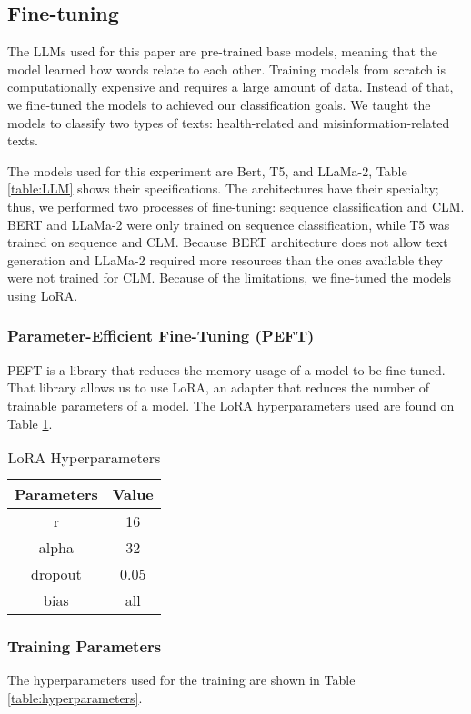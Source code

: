 \subsection{Fine-tuning}

The LLMs used for this paper are pre-trained base models, meaning that the model learned how words relate to each other. Training models from scratch is computationally expensive and requires a large amount of data. Instead of that, we fine-tuned the models to achieved our classification goals. We taught the models to classify two types of texts: health-related and misinformation-related texts. 

The models used for this experiment are Bert, T5, and LLaMa-2, Table \ref{table:LLM} shows their specifications. The architectures have their specialty; thus, we performed two processes of fine-tuning: sequence classification and CLM. BERT and LLaMa-2 were only trained on sequence classification, while T5 was trained on sequence and CLM. Because BERT architecture does not allow text generation and LLaMa-2 required more resources than the ones available they were not trained for CLM. Because of the limitations, we fine-tuned the models using LoRA. 

\subsubsection{Parameter-Efficient Fine-Tuning (PEFT)}
PEFT is a library that reduces the memory usage of a model to be fine-tuned. That library allows us to use LoRA, an adapter that reduces the number of trainable parameters of a model. The LoRA hyperparameters used are found on Table \ref{table:LoRA}.

\begin{table}[H]
	\centering
	\caption{LoRA Hyperparameters}
	{\small
	\begin{tabular}{|| c | c||} 
		\hline
		\textbf{Parameters} & \textbf{Value} \\
		\hline
		r & 16 \\
		\hline
		alpha & 32  \\
		\hline
		dropout & 0.05  \\
		\hline
		bias & all  \\
		\hline
	\end{tabular}
	}
	\label{table:LoRA}
\end{table}

\subsubsection{Training Parameters}
The hyperparameters used for the training are shown in Table \ref{table:hyperparameters}.

